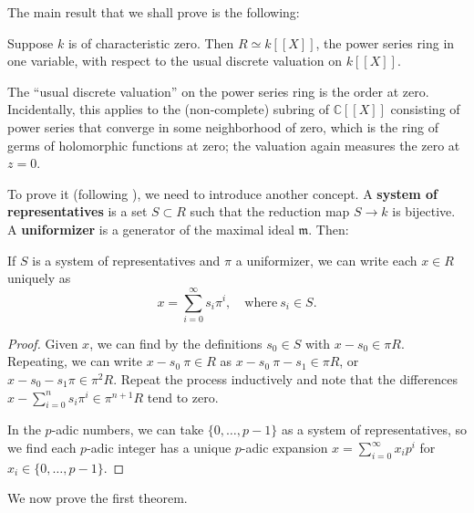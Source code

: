 The main result that we shall prove is the following:
\begin{theorem} Suppose $k$ is of characteristic zero.  Then $R \simeq k[[X]]$, the power series ring in one variable, with respect to the usual discrete valuation on $k[[X]]$.
\end{theorem}

The ``usual discrete valuation'' on the power series ring is the order at zero.  Incidentally, this applies to the (non-complete) subring of $\mathbb{C}[[X]]$ consisting of power series that converge in some neighborhood of zero, which is the ring of germs of holomorphic functions at zero; the valuation again measures the zero at $z=0$. 


To prove it (following \cite{Se79}), we need to introduce another concept.  A \textbf{system of representatives} is a set $S  \subset R$ such that the reduction map $S \to k$ is bijective.  A \textbf{uniformizer} is a generator of the maximal ideal $\mathfrak{m}$.  Then:

\begin{proposition} If $S$ is a system of representatives and $\pi$ a uniformizer, we can write each $x \in R$ uniquely as
\[ x=  \sum_{i=0}^\infty s_i \pi^i, \quad \mathrm{where} \ s_i \in S.\]
\end{proposition}
\begin{proof} 
Given $x$, we can find by the definitions $s_0 \in S$ with $x-s_0 \in \pi R$.  Repeating, we can write ${x-s_0}\ {\pi} \in R$ as ${x-s_0}\ {\pi} - s_1 \in \pi R$, or $x - s_0 - s_1 \pi \in \pi^2 R$.  Repeat the process inductively and note that the differences $x - \sum_{i=0}^{n} s_i \pi^i \in \pi^{n+1}R$ tend to zero.

In the $p$-adic numbers, we can take $\{0, \dots, p-1\}$ as a system of representatives, so we find each $p$-adic integer has a unique $p$-adic expansion $x = \sum_{i=0}^\infty x_i p^i$ for $x_i \in \{0, \dots, p-1\}$.
\end{proof} 

We now prove the first theorem.

